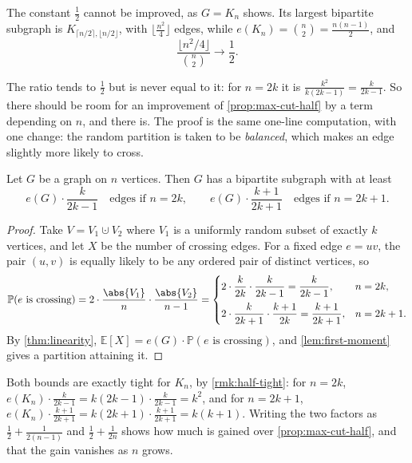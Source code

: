 \begin{remark}\label{rmk:half-tight}
    The constant \(\frac{1}{2}\) cannot be improved, as \(G = K_n\) shows. Its largest bipartite subgraph is \(K_{\lceil n/2 \rceil, \lfloor n/2 \rfloor}\), with \(\lfloor \frac{n^2}{4} \rfloor\) edges, while \(e(K_n) = \binom{n}{2} = \frac{n(n-1)}{2}\), and
    \[
        \frac{\lfloor n^2/4 \rfloor}{\binom{n}{2}} \longrightarrow \frac{1}{2}.
    \]
\end{remark}

The ratio tends to \(\frac{1}{2}\) but is never equal to it: for \(n = 2k\) it is \(\frac{k^2}{k(2k-1)} = \frac{k}{2k-1}\). So there should be room for an improvement of \autoref{prop:max-cut-half} by a term depending on \(n\), and there is. The proof is the same one-line computation, with one change: the random partition is taken to be \emph{balanced}, which makes an edge slightly more likely to cross.

\begin{theorem}\label{thm:max-cut-sharp}
    Let \(G\) be a graph on \(n\) vertices. Then \(G\) has a bipartite subgraph with at least
    \[
        e(G) \cdot \frac{k}{2k-1} \quad \text{edges if } n = 2k,
        \qquad
        e(G) \cdot \frac{k+1}{2k+1} \quad \text{edges if } n = 2k+1.
    \]
\end{theorem}

\begin{proof}
    Take \(V = V_1 \cupdot V_2\) where \(V_1\) is a uniformly random subset of exactly \(k\) vertices, and let \(X\) be the number of crossing edges. For a fixed edge \(e = uv\), the pair \((u,v)\) is equally likely to be any ordered pair of distinct vertices, so
    \[
        \mathbb{P}(e \text{ is crossing}) = 2 \cdot \frac{\abs{V_1}}{n} \cdot \frac{\abs{V_2}}{n-1} =
        \begin{cases}
            2 \cdot \dfrac{k}{2k} \cdot \dfrac{k}{2k-1} = \dfrac{k}{2k-1}, & n = 2k, \\[2ex]
            2 \cdot \dfrac{k}{2k+1} \cdot \dfrac{k+1}{2k} = \dfrac{k+1}{2k+1}, & n = 2k+1.
        \end{cases}
    \]
    By \autoref{thm:linearity}, \(\mathbb{E}[X] = e(G) \cdot \mathbb{P}(e \text{ is crossing})\), and \autoref{lem:first-moment} gives a partition attaining it.
\end{proof}

\begin{remark}
    Both bounds are exactly tight for \(K_n\), by \autoref{rmk:half-tight}: for \(n = 2k\), \(e(K_n) \cdot \frac{k}{2k-1} = k(2k-1) \cdot \frac{k}{2k-1} = k^2\), and for \(n = 2k+1\), \(e(K_n) \cdot \frac{k+1}{2k+1} = k(2k+1) \cdot \frac{k+1}{2k+1} = k(k+1)\). Writing the two factors as \(\frac{1}{2} + \frac{1}{2(n-1)}\) and \(\frac{1}{2} + \frac{1}{2n}\) shows how much is gained over \autoref{prop:max-cut-half}, and that the gain vanishes as \(n\) grows.
\end{remark}

